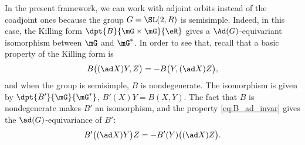 
In the present framework, we can work with adjoint orbits instead of the coadjoint ones because the group $G=\SL(2,R)$ is semisimple. Indeed, in this case, the Killing form $\dpt{B}{\mG\times\mG}{\eR}$ gives a $\Ad(G)$-equivariant isomorphism between $\mG$ and $\mG^*$. In order to see that, recall that a basic property of the Killing form is
\begin{equation}\label{eq:B_ad_invar}
	B\big( (\ad X)Y,Z \big)=-B\big(Y, (\ad X)Z \big),
\end{equation}
and when the group is semisimple, $B$ is nondegenerate. The isomorphism is given by
$\dpt{B'}{\mG}{\mG^*}$, $B'(X)Y=B(X,Y)$. The fact that $B$ is nondegenerate makes $B'$ an isomorphism, and the property \eqref{eq:B_ad_invar} gives the $\ad(G)$-equivariance of $B'$:
\[
	B'\big( (\ad X)Y \big)Z=-B'(Y)\big( (\ad X)Z\big).
\]

